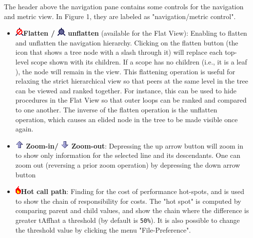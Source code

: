  The header above the navigation pane contains some controls for the navigation and metric view. In Figure 1, they are labeled as "navigation/metric control".
\begin{itemize}
\item
\includegraphics{fig/Flatten.png}\textbf{Flatten /
\includegraphics{fig/Unflatten.png} unflatten} (available for the Flat View): Enabling to flatten and unflatten the navigation hierarchy. Clicking on the flatten button (the icon that shows a tree node with a slash through it) will replace each top-level scope shown with its children. If a scope has no children (i.e., it is a leaf ), the node will remain in the view. This flattening operation is useful for relaxing the strict hierarchical view so that peers at the same level in the tree can be viewed and ranked together. For instance, this can be used to hide procedures in the Flat View so that outer loops can be ranked and compared to one another. The inverse of the flatten operation is the unflatten operation, which causes an elided node in the tree to be made visible once again.

\item \textbf{
\includegraphics{fig/ZoomIn.png} Zoom-in/
\includegraphics{fig/ZoomOut.png} Zoom-out}: Depressing the up arrow button will zoom in to show only information for the selected line and its descendants. One can zoom out (reversing a prior zoom operation) by depressing the down arrow button

\item
\includegraphics{fig/flameIcon.png}\textbf{Hot call path}: Finding for the cost of performance hot-spots, and is used to show the chain of responsibility for costs. The "hot spot" is computed by comparing parent and child values, and show the chain where the difference is greater tAffhat a threshold (by default is
\texttt{50\%}). It is also possible to change the threshold value by clicking the menu "File-Preference".


\end{itemize}
